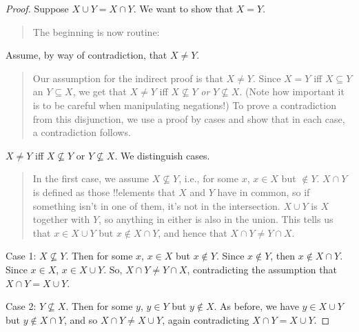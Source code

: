 \documentclass[../../../include/open-logic-section]{subfiles}
\begin{document}
\begin{proof}
  Suppose $X \cup Y = X \cap Y$. We want to show that $X = Y$.
  \begin{quote}
    The beginning is now routine:
  \end{quote}
  Assume, by way of contradiction, that $X \neq Y$.
  \begin{quote}
    Our assumption for the indirect proof is that $X \neq Y$. Since $X
    = Y$ iff $X \subseteq Y$ an $Y \subseteq X$, we get that $X \neq
    Y$ iff $X \nsubseteq Y$ \emph{or} $Y \nsubseteq X$. (Note how
    important it is to be careful when manipulating negations!{}) To
    prove a contradiction from this disjunction, we use a proof by
    cases and show that in each case, a contradiction follows.
  \end{quote}
  $X \neq Y$ iff $X \nsubseteq Y$ or $Y \nsubseteq X$. We distinguish cases.
  \begin{quote}
    In the first case, we assume $X \nsubseteq Y$, i.e., for some $x$,
    $x \in X$ but $\notin Y$. $X \cap Y$ is defined as those
    !!{element}s that $X$ and $Y$ have in common, so if something
    isn't in one of them, it's not in the intersection. $X \cup Y$ is
    $X$ together with $Y$, so anything in either is also in the
    union. This tells us that $x \in X \cup Y$ but $x \notin X \cap
    Y$, and hence that $X \cap Y \neq Y \cap X$.
  \end{quote}
  
  Case 1: $X \nsubseteq Y$. Then for some $x$, $x \in X$ but $x \notin
  Y$. Since $x \notin Y$, then $x \notin X \cap Y$. Since $x \in X$,
  $x \in X \cup Y$. So, $X \cap Y \neq Y \cap X$, contradicting the
  assumption that $X \cap Y = X \cup Y$.

  Case 2: $Y \nsubseteq X$. Then for some $y$, $y \in Y$ but $y \notin
  X$. As before, we have $y \in X \cup Y$ but $y \notin X \cap Y$, and
  so $X \cap Y \neq X \cup Y$, again contradicting $X \cap Y = X \cup
  Y$. 
\end{proof}
\end{document}
